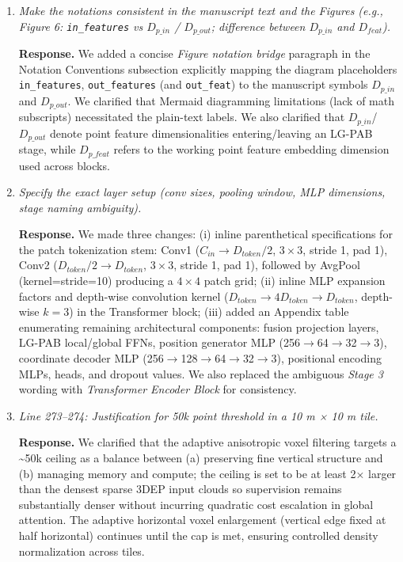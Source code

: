 \documentclass[11pt]{article}
\newcommand{\response}{\textbf{Response.} }
\begin{document}
\begin{enumerate}
  \item \emph{Make the notations consistent in the manuscript text and the Figures (e.g., Figure 6: \texttt{in\_features} vs $D_{p\_in}$ / $D_{p\_out}$; difference between $D_{p\_in}$ and $D_{feat}$).}

  \response We added a concise \emph{Figure notation bridge} paragraph in the Notation Conventions subsection explicitly mapping the diagram placeholders \texttt{in\_features}, \texttt{out\_features} (and \texttt{out\_feat}) to the manuscript symbols $D_{p\_in}$ and $D_{p\_out}$. We clarified that Mermaid diagramming limitations (lack of math subscripts) necessitated the plain-text labels. We also clarified that $D_{p\_in}$/$D_{p\_out}$ denote point feature dimensionalities entering/leaving an LG-PAB stage, while $D_{p\_feat}$ refers to the working point feature embedding dimension used across blocks.

  \item \emph{Specify the exact layer setup (conv sizes, pooling window, MLP dimensions, stage naming ambiguity).}

  \response We made three changes: (i) inline parenthetical specifications for the patch tokenization stem: Conv1 ($C_{in}\rightarrow D_{token}/2$, $3\times3$, stride 1, pad 1), Conv2 ($D_{token}/2\rightarrow D_{token}$, $3\times3$, stride 1, pad 1), followed by AvgPool (kernel=stride=10) producing a $4\times4$ patch grid; (ii) inline MLP expansion factors and depth-wise convolution kernel ($D_{token}\rightarrow 4D_{token} \rightarrow D_{token}$, depth-wise $k=3$) in the Transformer block; (iii) added an Appendix table enumerating remaining architectural components: fusion projection layers, LG-PAB local/global FFNs, position generator MLP (256$\rightarrow$64$\rightarrow$32$\rightarrow$3), coordinate decoder MLP (256$\rightarrow$128$\rightarrow$64$\rightarrow$32$\rightarrow$3), positional encoding MLPs, heads, and dropout values. We also replaced the ambiguous \emph{Stage 3} wording with \emph{Transformer Encoder Block} for consistency.

  \item \emph{Line 273–274: Justification for 50k point threshold in a 10 m × 10 m tile.}

  \response We clarified that the adaptive anisotropic voxel filtering targets a \textasciitilde50k ceiling as a balance between (a) preserving fine vertical structure and (b) managing memory and compute; the ceiling is set to be at least 2× larger than the densest sparse 3DEP input clouds so supervision remains substantially denser without incurring quadratic cost escalation in global attention. The adaptive horizontal voxel enlargement (vertical edge fixed at half horizontal) continues until the cap is met, ensuring controlled density normalization across tiles.


\end{enumerate}
\end{document}
